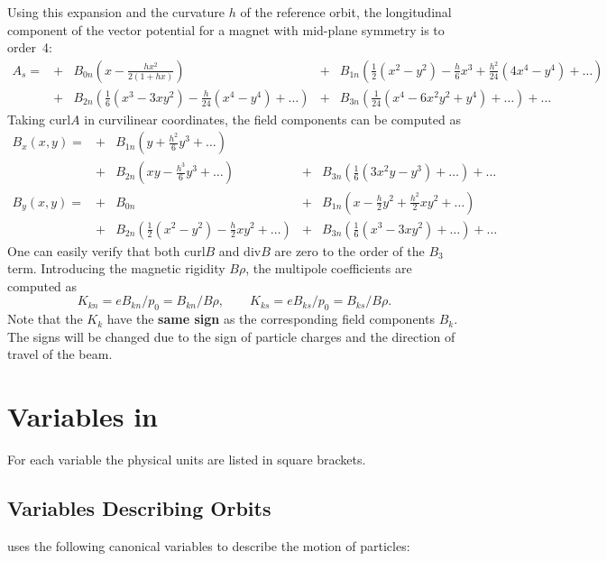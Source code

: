 Using this expansion and the curvature $h$ of the reference orbit,
the longitudinal component of the vector potential for a magnet with
mid-plane symmetry is to order~4:
\[
\begin{array}{rclcl}
  A_s=&+&B_{0n}\left(x-\frac{hx^2}{2(1+hx)}\right)
  &+&B_{1n}\left(\frac{1}{2}(x^2-y^2)-\frac{h}{6}x^{3}
    +\frac{h^2}{24}(4x^{4}-y^{4})+\ldots\right) \\
  &+&B_{2n}\left(\frac{1}{6}(x^{3}-3xy^2)-\frac{h}{24}(x^{4}-y^{4})
    +\ldots\right)
  &+&B_{3n}\left(\frac{1}{24}(x^{4}-6x^2y^2+y^{4})+\ldots\right)
  + \ldots
\end{array}
\]
Taking $\mathrm{curl} A$ in curvilinear coordinates,
the field components can be computed as
\[
\begin{array}{rclcl}
  B_x(x,y)=
  &+&B_{1n}\left(y+\frac{h^2}{6}y^{3}+\ldots\right) \\
  &+&B_{2n}\left(xy-\frac{h^{3}}{6}y^{3}+\ldots\right)
  &+&B_{3n}\left(\frac{1}{6}(3x^2y-y^{3})+\ldots\right) + \ldots \\
  B_y(x,y)=&+&B_{0n}
  &+&B_{1n}\left(x-\frac{h}{2}y^2+\frac{h^2}{2}xy^2+\ldots\right) \\
  &+&B_{2n}\left(\frac{1}{2}(x^2-y^2)-\frac{h}{2}xy^2+\ldots\right)
  &+&B_{3n}\left(\frac{1}{6}(x^{3}-3xy^2)+\ldots\right) + \ldots
\end{array}
\]
One can easily verify that both $\mathrm{curl} B$ and $\mathrm{div} B$
are zero to the order of the $B_3$ term.
Introducing the magnetic rigidity $B \rho$,
the multipole coefficients are computed as
\[
K_{kn}=eB_{kn}/p_0=B_{kn}/B\rho,\qquad
K_{ks}=eB_{ks}/p_0=B_{ks}/B\rho.
\]
Note that the $K_k$ have the \textbf{same sign} as the corresponding
field components $B_k$.
The signs will be changed due to the sign of particle charges and
the direction of travel of the beam.

\section{Variables in \opalt}
\label{sec:variablesopalt}
For each variable the physical units are listed in square brackets.

\subsection{Variables Describing Orbits}
\label{sec:canon}
\opalt uses the following canonical variables
to describe the motion of particles:

